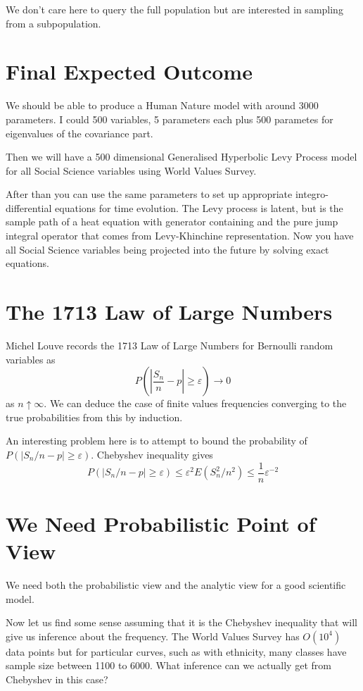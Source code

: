 \documentclass{amsart}
\begin{document}
We don't care here to query the full population but are interested in sampling from a subpopulation.

\section{Final Expected Outcome}

We should be able to produce a Human Nature model with around 3000 parameters.  I could 500 variables, 5 parameters each plus 500 parametes for eigenvalues of the covariance part. 

Then we will have a 500 dimensional Generalised Hyperbolic Levy Process model for all Social Science variables using World Values Survey.

After than you can use the same parameters to set up appropriate integro-differential equations for time evolution.  The Levy process is latent, but is the sample path of a heat equation with generator containing and the pure jump integral operator that comes from Levy-Khinchine representation.  Now you have all Social Science variables being projected into the future by solving exact equations.

\section{The 1713 Law of Large Numbers}

Michel Louve records the 1713 Law of Large Numbers for Bernoulli random variables as
\[
P( | \frac{S_n}{n} - p | \ge \varepsilon ) \rightarrow 0
\]
as $n\uparrow\infty$.  We can deduce the case of finite values frequencies converging to the true probabilities from this by induction.

An interesting problem here is to attempt to bound the probability of $P( |S_n/n - p| \ge \varepsilon)$.  Chebyshev inequality gives
\[
P( | S_n/n - p | \ge \varepsilon ) \le \varepsilon^2 E( S_n^2/n^2 ) \le \frac{1}{n} \varepsilon^{-2}
\]

\section{We Need Probabilistic Point of View}

We need both the probabilistic view and the analytic view for a good scientific model.  

Now let us find some sense assuming that it is the Chebyshev inequality that will give us inference about the frequency.  The World Values Survey has $O(10^4)$ data points but for particular curves, such as with ethnicity, many classes have sample size between 1100 to 6000.  What inference can we actually get from Chebyshev in this case?
\end{document}
